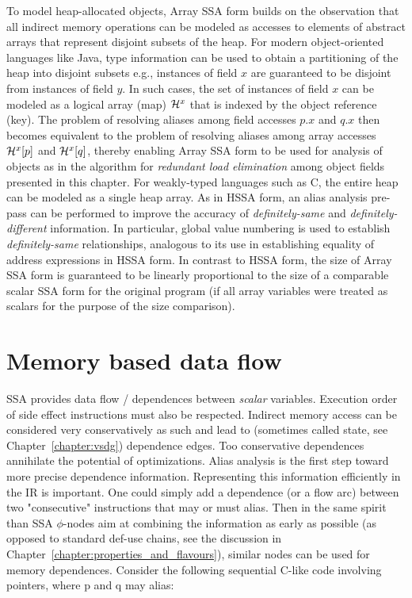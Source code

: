 To model heap-allocated objects, Array SSA form builds on the observation that all indirect memory operations can be modeled as accesses to elements of abstract arrays that represent disjoint subsets of the heap. 
For modern object-oriented languages like Java, type information can be used to obtain a partitioning of the heap into disjoint subsets e.g., instances of field $x$ are guaranteed to be disjoint from instances of field $y$. 
In such cases, the set of instances of field $x$ can be modeled as a logical array (map) ${\cal H}^x$ that is indexed by the object reference (key). 
The problem of resolving aliases among field accesses $p.x$ and $q.x$ then becomes equivalent to the problem of resolving aliases among array accesses ${\cal H}^x[p]$ and ${\cal H}^x[q]$, thereby enabling Array SSA form to be used for analysis of objects as in the algorithm for {\em redundant load elimination} among object fields presented in this chapter. 
For weakly-typed languages such as C, the entire heap can be modeled as a single heap array. 
As in HSSA form, an alias analysis pre-pass can be performed to improve the accuracy of {\em definitely-same} and {\em definitely-different} information. 
In particular, global value numbering is used to establish {\em definitely-same} relationships, analogous to its use in establishing equality of address expressions in HSSA form. 
In contrast to HSSA form, the size of Array SSA form is guaranteed to be linearly proportional to the size of a comparable scalar SSA form for the original program (if all array variables were treated as scalars for the purpose of the size comparison).

\section{Memory based data flow}
SSA provides data flow / dependences between \emph{scalar} variables. 
Execution order of side effect instructions must also be respected. 
Indirect memory access can be considered very conservatively as such and lead to (sometimes called state, see Chapter~\ref{chapter:vsdg}) dependence edges. 
Too conservative dependences annihilate the potential of optimizations. 
Alias analysis is the first step toward more precise dependence information. 
Representing this information efficiently in the IR is important. 
One could simply add a dependence (or a flow arc) between two "consecutive" instructions that may or must alias. 
Then in the same spirit than SSA $\phi$-nodes aim at combining the information as early as possible (as opposed to standard def-use chains, see the discussion in Chapter~\ref{chapter:properties_and_flavours}), similar nodes can be used for memory dependences. 
Consider the following sequential C-like code involving pointers, where p and q may alias:

